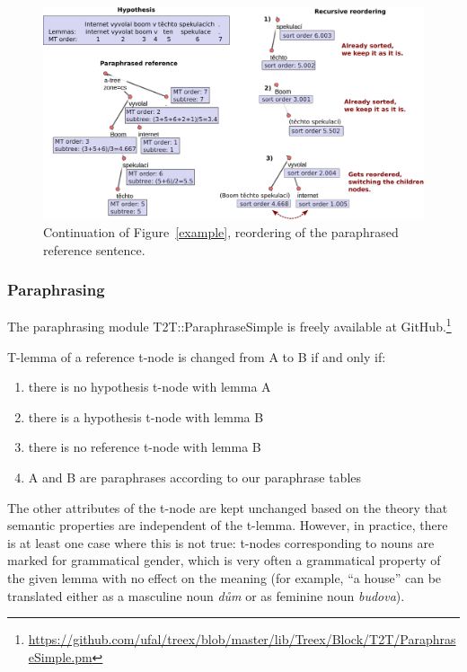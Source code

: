 \documentclass[11pt]{article}
\def\Fref#1{Figure~\ref{#1}}
\def\footurl#1{\footnote{\url{#1}}}
\begin{document}
\begin{figure}[tb]
\begin{center}
\includegraphics[scale=0.32]{reordering.png} 
\caption{Continuation of \Fref{example}, reordering of the paraphrased reference
sentence.}
\label{reordering}
\end{center}
\end{figure}

\subsubsection{Paraphrasing}
The paraphrasing module T2T::ParaphraseSimple is freely available at 
GitHub.\footurl{https://github.com/ufal/treex/blob/master/lib/Treex/Block/T2T/ParaphraseSimple.pm} 

T-lemma of a reference t-node is changed from A to B if and only if:
\begin{enumerate}
\item there is no hypothesis t-node with lemma A
\item there is a hypothesis t-node with lemma B 
\item there is no reference t-node with lemma B
\item A and B are paraphrases according to our paraphrase tables
\end{enumerate}

The other attributes of the t-node are kept unchanged based on the theory that
semantic properties are independent of the t-lemma. However, in practice, there 
is at least one case where this is not true: t-nodes corresponding to nouns are 
marked for grammatical gender, which is very often a grammatical property of 
the given lemma with no effect on the meaning (for example, ``a house'' can be 
translated either as a masculine noun \textit{dům} or as feminine noun 
\textit{budova}).
\end{document}
